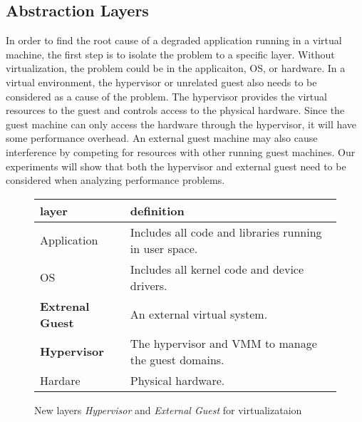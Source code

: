 \subsection{Abstraction Layers}
In order to find the root cause of a degraded application running in a virtual machine, the first step is to isolate the problem to a specific layer. Without virtualization, the problem could be in the applicaiton, OS, or hardware.  In a virtual environment, the hypervisor or unrelated guest also needs to be considered as a cause of the problem.  The hypervisor provides the virtual resources to the guest and controls access to the physical hardware.  Since the guest machine can only access the hardware through the hypervisor, it will have some performance overhead. An external guest machine may also cause interference by competing for resources with other running guest machines.  Our experiments will show that both the hypervisor and external guest need to be considered when analyzing performance problems.
\begin{figure}
\begin{tabular}{ l p{5cm} }
  layer & definition \\
  \hline
  Application & Includes all code and libraries running in user space. \\
  OS & Includes all kernel code and device drivers. \\
  \textbf{Extrenal Guest} & An external virtual system. \\
  \textbf{Hypervisor} & The hypervisor and VMM to manage the guest domains. \\
  Hardare & Physical hardware. \\
\end{tabular}
\caption{New layers \emph{Hypervisor} and \emph{External Guest} for virtualizataion}
\label{fig:layers}
\end{figure}


